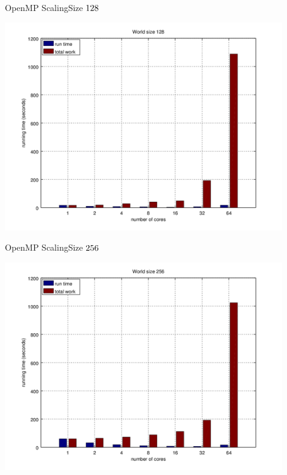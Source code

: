 \documentclass{beamer}
\begin{document}
\begin{frame}{OpenMP Scaling}{Size $128 \time 128$}
    \begin{center}
        \includegraphics[width=0.9\textwidth]{scaling-128}
    \end{center}
\end{frame}

\begin{frame}{OpenMP Scaling}{Size $256 \time 256$}
    \begin{center}
        \includegraphics[width=0.9\textwidth]{scaling-256}
    \end{center}
\end{frame}
\end{document}
